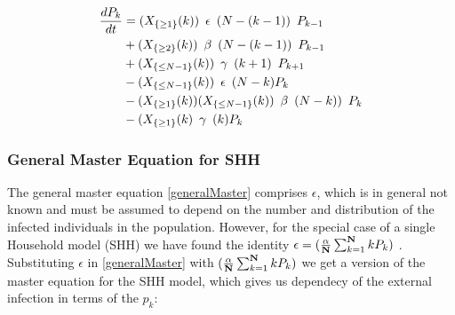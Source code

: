 \documentclass[paper=a4, fontsize=11pt, twoside, BCOR=12mm, parskip=full, listof=totoc]{scrreprt}
\begin{document}
	\begin{equation}\label{generalMaster} 
		\begin{aligned}
			{\frac{dP_k}{dt}} & =({X}_{ \{\geq 1 \}}(k))	\hspace{5pt} \epsilon \hspace{5pt} (N-(k-1))\hspace{5pt} P_{k-1} \\
				 & +({X}_{ \{\geq 2 \}}(k))	\hspace{5pt} \beta \hspace{5pt} (N-(k-1)) \hspace{5pt} P_{k-1}\\
				 & +({X}_{\{\leq N-1\}}(k)) \hspace{5pt} \gamma \hspace{5pt} (k+1) \hspace{5pt} P_{k+1}\\
				 & -({X}_{\{\leq N-1\}}(k)) \hspace{5pt} \epsilon \hspace{5pt} (N-k)P_{k}	\\
				 & -({X}_{ \{\geq 1 \}}(k))({X}_{\{\leq N-1\}}(k)) \hspace{5pt} \beta \hspace{5pt} (N-k)) \hspace{5pt} P_{k}\\
				 & -({X}_{ \{\geq 1 \}}(k)    \hspace{5pt}  \gamma \hspace{5pt} (k)P_{k}
		\end{aligned}
	\end{equation}

\subsubsection*{General Master Equation for SHH}

	The general master equation \ref{generalMaster} comprises  $\epsilon$, which is in general not known and must be assumed to depend on the number and distribution of the infected individuals in the population.
	However, for the special case of a single Household model (SHH) we have found the identity 
	$\epsilon=( \frac{\alpha}{\bf{N}} \sum_{k=1}^{\bf N}kP_k )$ . Substituting $\epsilon$ in \ref{generalMaster} with 
	$( \frac{\alpha}{\bf{N}} \sum_{k=1}^{\bf N}kP_k )$ we get a version of the master equation for the SHH model, which gives us dependecy of the 
	external infection in terms of the $p_k$:
	
\end{document}
